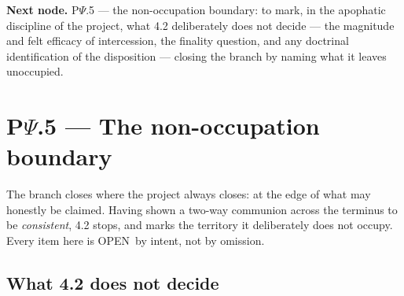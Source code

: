 \documentclass[11pt,a4paper]{article}
\newcommand{\stOpen}{\textcolor{cOpn}{\textsf{\small OPEN}}}
\theoremstyle{definition}
\theoremstyle{plain}
\theoremstyle{remark}
\begin{document}
\medskip
\textbf{Next node.} P$\Psi$.5 --- the non-occupation boundary: to mark, in the apophatic
discipline of the project, what 4.2 deliberately does not decide --- the magnitude and felt
efficacy of intercession, the finality question, and any doctrinal identification of the
disposition --- closing the branch by naming what it leaves unoccupied.

\section{P$\Psi$.5 --- The non-occupation boundary}

The branch closes where the project always closes: at the edge of what may honestly be
claimed. Having shown a two-way communion across the terminus to be \emph{consistent}, 4.2
stops, and marks the territory it deliberately does not occupy. Every item here is \stOpen\ by
intent, not by omission.

\subsection{What 4.2 does not decide}
\end{document}
